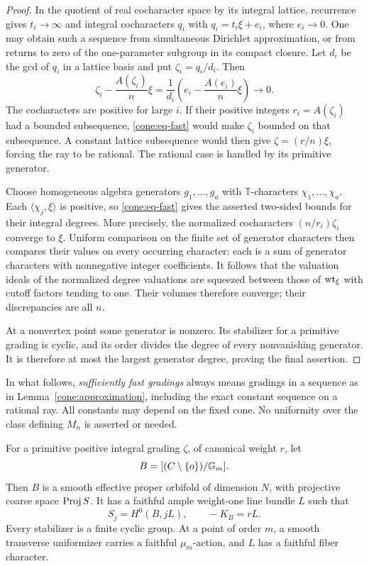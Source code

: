 \begin{proof}
In the quotient of real cocharacter space by its integral
lattice, recurrence gives \(t_i\to\infty\) and integral
cocharacters \(q_i\) with \(q_i=t_i\xi+e_i\), where \(e_i\to0\).
One may obtain such a sequence from simultaneous Dirichlet
approximation, or from returns to zero of the one-parameter
subgroup in its compact closure. Let \(d_i\) be the gcd of
\(q_i\) in a lattice basis and put \(\zeta_i=q_i/d_i\).
Then
\[
 \zeta_i-\frac{A(\zeta_i)}n\xi
       =\frac1{d_i}\left(e_i-\frac{A(e_i)}n\xi\right)\longrightarrow0.
\]
The cocharacters are positive for large \(i\).
If their positive integers \(r_i=A(\zeta_i)\) had a bounded
subsequence, \eqref{cone:eq-fast} would make \(\zeta_i\)
bounded on that subsequence. A constant lattice subsequence
would then give \(\zeta=(r/n)\xi\), forcing the ray to be
rational. The rational case is handled by its primitive
generator.

Choose homogeneous algebra generators \(g_1,\ldots,g_a\)
with \(\mathbb T\)-characters \(\chi_1,\ldots,\chi_a\).
Each \(\langle\chi_j,\xi\rangle\) is positive, so
\eqref{cone:eq-fast} gives the asserted two-sided bounds
for their integral degrees. More precisely, the normalized
cocharacters \((n/r_i)\zeta_i\) converge to \(\xi\).
Uniform comparison on the finite set of generator characters
then compares their values on every occurring character:
each is a sum of generator characters with nonnegative
integer coefficients. It follows that the valuation ideals
of the normalized degree valuations are squeezed between
those of \(\operatorname{wt}_\xi\) with cutoff factors tending to one.
Their volumes therefore converge; their discrepancies are
all \(n\).

At a nonvertex point some generator is nonzero. Its
stabilizer for a primitive grading is cyclic, and its order
divides the degree of every nonvanishing generator. It is
therefore at most the largest generator degree, proving
the final assertion.
\end{proof}

In what follows, \emph{sufficiently fast gradings} always means
gradings in a sequence as in Lemma~\ref{cone:approximation},
including the exact constant sequence on a rational ray.
All constants may depend on the fixed cone. No uniformity
over the class defining \(M_n\) is asserted or needed.

\begin{lemma}\label{cone:orbifold}
For a primitive positive integral grading \(\zeta\), of
canonical weight \(r\), let
\[
          B=[(C\setminus\{o\})/\mathbb G_m].
\]
Then \(B\) is a smooth effective proper orbifold of dimension
\(N\), with projective coarse space \(\operatorname{Proj} S\).
It has a faithful ample weight-one line bundle \(L\) such that
\begin{equation}\label{cone:eq-section-ring}
         S_j=H^0(B,jL),\qquad -K_B=rL.
\end{equation}
Every stabilizer is a finite cyclic group. At a point of
order \(m\), a smooth transverse uniformizer carries a
faithful \(\mu_m\)-action, and \(L\) has a faithful fiber
character.
\end{lemma}

